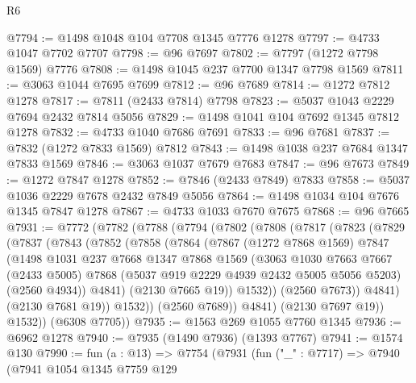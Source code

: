 \begin{lexlean}{R6}
\begin{coremodule}
@7794 := @1498 @1048 @104 @7708 @1345 @7776 @1278
@7797 := @4733 @1047 @7702 @7707
@7798 := @96 @7697
@7802 := @7797 (@1272 @7798 @1569) @7776
@7808 := @1498 @1045 @237 @7700 @1347 @7798 @1569
@7811 := @3063 @1044 @7695 @7699
@7812 := @96 @7689
@7814 := @1272 @7812 @1278
@7817 := @7811 (@2433 @7814) @7798
@7823 := @5037 @1043 @2229 @7694 @2432 @7814 @5056
@7829 := @1498 @1041 @104 @7692 @1345 @7812 @1278
@7832 := @4733 @1040 @7686 @7691
@7833 := @96 @7681
@7837 := @7832 (@1272 @7833 @1569) @7812
@7843 := @1498 @1038 @237 @7684 @1347 @7833 @1569
@7846 := @3063 @1037 @7679 @7683
@7847 := @96 @7673
@7849 := @1272 @7847 @1278
@7852 := @7846 (@2433 @7849) @7833
@7858 := @5037 @1036 @2229 @7678 @2432 @7849 @5056
@7864 := @1498 @1034 @104 @7676 @1345 @7847 @1278
@7867 := @4733 @1033 @7670 @7675
@7868 := @96 @7665
@7931 := @7772
    (@7782
      (@7788
        (@7794
          (@7802
            (@7808
              (@7817
                (@7823
                  (@7829
                    (@7837
                      (@7843
                        (@7852
                          (@7858
                            (@7864
                              (@7867
                                (@1272 @7868 @1569)
                                @7847
                                (@1498
                                  @1031
                                  @237
                                  @7668
                                  @1347
                                  @7868
                                  @1569
                                  (@3063
                                    @1030
                                    @7663
                                    @7667
                                    (@2433 @5005)
                                    @7868
                                    (@5037 @919 @2229 @4939 @2432 @5005 @5056 @5203)
                                    (@2560 @4934))
                                  @4841)
                                (@2130 @7665 @19))
                              @1532))
                          (@2560 @7673))
                        @4841)
                      (@2130 @7681 @19))
                    @1532))
                (@2560 @7689))
              @4841)
            (@2130 @7697 @19))
          @1532))
      (@6308 @7705))
@7935 := @1563 @269 @1055 @7760 @1345
@7936 := @6962 @1278
@7940 := @7935 (@1490 @7936) (@1393 @7767)
@7941 := @1574 @130
@7990 := fun (a : @13) =>
  @7754
    (@7931
      (fun ("_" : @7717) =>
      @7940
        (@7941
          @1054
          @1345
          @7759
          @129

\end{coremodule}
\end{lexlean}
